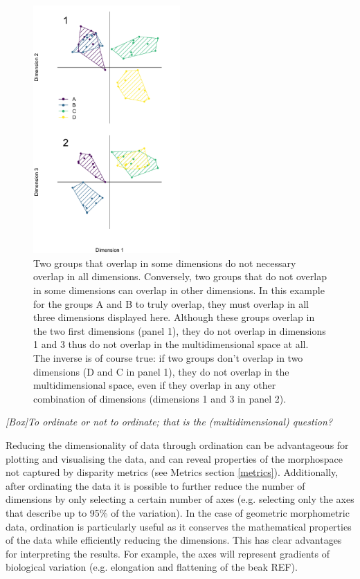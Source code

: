 \documentclass[12pt,letterpaper]{article}
\renewcommand{\subsection}[1]{%
\bigskip
\begin{center}
\begin{large}
\normalfont\itshape #1
\end{large}
\end{center}}
\begin{document}
\begin{figure}[!htbp]
\centering
   \includegraphics[width=0.5\textwidth]{Figures/dimensionsOverlap.pdf}
\caption{\small{Two groups that overlap in some dimensions do not necessary overlap in all dimensions. 
Conversely, two groups that do not overlap in some dimensions can overlap in other dimensions.
In this example for the groups A and B to truly overlap, they must overlap in all three dimensions displayed here.
Although these groups overlap in the two first dimensions (panel 1), they do not overlap in dimensions 1 and 3 thus do not overlap in the multidimensional space at all.
The inverse is of course true: if two groups don't overlap in two dimensions (D and C in panel 1), they do not overlap in the multidimensional space, even if they overlap in any other combination of dimensions (dimensions 1 and 3 in panel 2).}} 
\label{Fig:RF_results_best}
\end{figure}



\subsection{[Box]To ordinate or not to ordinate; that is the (multidimensional) question?}
\label{box_ordination}
Reducing the dimensionality of data through ordination can be advantageous for plotting and visualising the data, and can reveal properties of the morphospace not captured by disparity metrics (see Metrics section \ref{metrics}).
Additionally, after ordinating the data it is possible to further reduce the number of dimensions by only selecting a certain number of axes (e.g. selecting only the axes that describe up to 95\% of the variation).
In the case of geometric morphometric data, ordination is particularly useful as it conserves the mathematical properties of the data while efficiently reducing the dimensions.
This has clear advantages for interpreting the results.
For example, the axes will represent gradients of biological variation (e.g. elongation and flattening of the beak REF).
\end{document}
